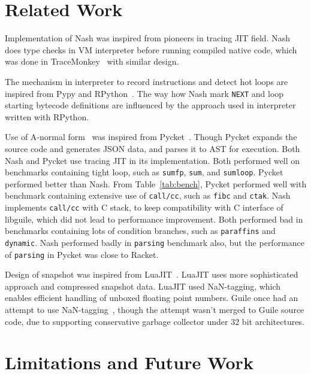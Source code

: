 \documentclass[preprint, 10pt]{sigplanconf}
\begin{document}
\section{Related Work}
\label{sec:related}
Implementation of Nash was inspired from pioneers in tracing JIT field. Nash
does type checks in VM interpreter before running compiled native code, which
was done in TraceMonkey~\cite{gal2009trace} with similar design.

The mechanism in interpreter to record instructions and detect hot loops are
inspired from Pypy and RPython~\cite{bolz2009tracing}. The way how Nash mark
\texttt{NEXT} and loop starting bytecode definitions are influenced by the
approach used in interpreter written with RPython.


Use of A-normal form~\cite{flanagan1993essence} was inspired from
Pycket~\cite{bauman2015pycket}. Though Pycket expands the source code and
generates JSON data, and parses it to AST for execution. Both Nash and Pycket
use tracing JIT in its implementation. Both performed well on benchmarks
containing tight loop, such as \texttt{sumfp}, \texttt{sum}, and
\texttt{sumloop}. Pycket performed better than Nash. From
Table~\hyperref[tab:bench]{\ref{tab:bench}}, Pycket performed well with
benchmark containing extensive use of \texttt{call/cc}, such as \texttt{fibc}
and \texttt{ctak}. Nash implements \texttt{call/cc} with C stack, to keep
compatibility with C interface of libguile, which did not lead to performance
improvement. Both performed bad in benchmarks containing lots of condition
branches, such as \texttt{paraffins} and \texttt{dynamic}. Nash performed badly
in \texttt{parsing} benchmark also, but the performance of \texttt{parsing} in
Pycket was close to Racket.

Design of snapshot was inspired from LuaJIT~\cite{pall2009ip}. LuaJIT uses more
sophisticated approach and compressed snapshot data. LuaJIT used NaN-tagging,
which enables efficient handling of unboxed floating point numbers. Guile once
had an attempt to use NaN-tagging~\cite{wingo2011value}, though the attempt
wasn't merged to Guile source code, due to supporting conservative garbage
collector under 32 bit architectures.

\section{Limitations and Future Work}
\label{sec:future}
\end{document}
